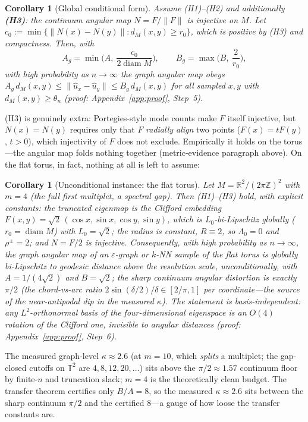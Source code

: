 \documentclass[11pt]{article}
\newtheorem{corollary}[theorem]{Corollary}
\theoremstyle{remark}
\begin{document}
\begin{corollary}[Global conditional form]\label{cor:global}
Assume (H1)--(H2) and additionally \textbf{(H3)}: the continuum angular
map $N=F/\lVert F\rVert$ is injective on $M$. Let
$c_0:=\min\{\lVert N(x)-N(y)\rVert : d_M(x,y)\ge r_0\}$, which is positive by
(H3) and compactness. Then, with
\[
A_g=\min\Big(A,\ \frac{c_0}{2\operatorname{diam}M}\Big),\qquad
B_g=\max\Big(B,\ \frac{2}{r_0}\Big),
\]
with high probability as $n\to\infty$ the graph angular map obeys
$A_g\,d_M(x,y)\le\lVert\hat u_x-\hat u_y\rVert\le B_g\,d_M(x,y)$ for
\emph{all} sampled $x,y$ with $d_M(x,y)\ge\theta_n$
(proof: Appendix~\ref{app:proof}, Step~5).
\end{corollary}

(H3) is genuinely extra: Portegies-style mode counts \cite{portegies2016}
make $F$ itself injective, but $N(x)=N(y)$ requires only that $F$ \emph{radially
align} two points ($F(x)=tF(y)$, $t>0$), which injectivity of $F$ does not
exclude. Empirically it holds on the torus---the angular map folds nothing
together (metric-evidence paragraph above). On the flat torus, in fact, nothing
at all is left to assume:

\begin{corollary}[Unconditional instance: the flat torus]\label{cor:torus}
Let $M=\mathbb{R}^2/(2\pi\mathbb{Z})^2$ with $m=4$ (the full first
multiplet, a spectral gap). Then (H1)--(H3) \emph{hold}, with explicit
constants: the truncated eigenmap is the Clifford embedding
$F(x,y)=\sqrt2\,(\cos x,\sin x,\cos y,\sin y)$, which is $L_0$-bi-Lipschitz
\emph{globally} ($r_0=\operatorname{diam}M$) with $L_0=\sqrt2$; the radius is
constant, $R\equiv2$, so $\Lambda_0=0$ and $\rho^\pm=2$; and $N=F/2$ is
injective. Consequently, with high probability as $n\to\infty$, the graph
angular map of an $\varepsilon$-graph or $k$-NN sample of the flat torus is
globally bi-Lipschitz to geodesic distance above the resolution scale,
\emph{unconditionally}, with $A=1/(4\sqrt2)$ and $B=\sqrt2$; the sharp
continuum angular distortion is exactly $\pi/2$ (the chord-vs-arc ratio
$2\sin(\delta/2)/\delta\in[2/\pi,1]$ per coordinate---the source of the
near-antipodal dip in the measured $\kappa$). The statement is basis-independent: any
$L^2$-orthonormal basis of the four-dimensional eigenspace is an $O(4)$
rotation of the Clifford one, invisible to angular distances (proof:
Appendix~\ref{app:proof}, Step~6).
\end{corollary}

The measured graph-level $\kappa\approx2.6$ (at $m{=}10$, which \emph{splits} a
multiplet; the gap-closed cutoffs on $\mathbb T^2$ are $4,8,12,20,\dots$) sits
above the $\pi/2\approx1.57$ continuum floor by finite-$n$ and truncation slack;
$m{=}4$ is the theoretically clean budget. The transfer theorem certifies only
$B/A=8$, so the measured $\kappa\approx2.6$ sits between the sharp continuum $\pi/2$
and the certified $8$---a gauge of how loose the transfer constants are.
\end{document}
